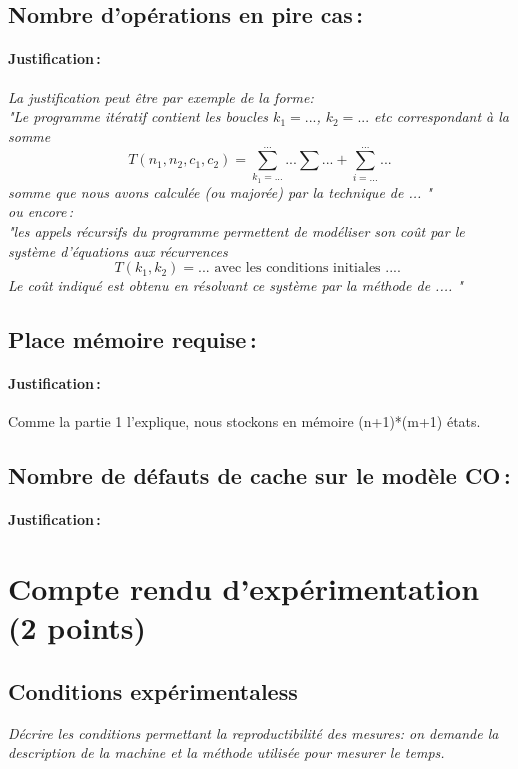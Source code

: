 \documentclass[a4paper, 10pt, french]{article}
\begin{document}
  \subsection{Nombre  d'opérations en pire cas\,: }
    \paragraph{Justification\,: }
    {\em La justification peut être par exemple de la forme: \\ 
       "Le programme itératif contient les boucles $k_1=...$, $k_2= ...$ etc correspondant à la somme 
      $$T(n_1, n_2, c_1, c_2) = \sum_{k_1=...}^{...} ... \sum ... + \sum_{i=...}^{...} ...$$ 
      somme que nous avons calculée (ou majorée) par la technique de  ... " \\
      ou  encore\,:  \\
      "les appels récursifs du programme permettent de modéliser son coût par le système d'équations aux récurrences 
      $$T(k_1, k_2) = ...  \mbox{~avec~les~conditions~initiales~....~} $$
      Le coût indiqué est obtenu en résolvant ce système par la méthode de  .... "
    } 
  \subsection{Place mémoire requise\,: }
    \paragraph{Justification\,: }
    {
    	Comme la partie 1 l'explique, nous stockons en mémoire (n+1)*(m+1) états.
    }

  \subsection{Nombre de défauts de cache sur le modèle CO\,: }
    \paragraph{Justification\,: }


\section{Compte rendu d'expérimentation (2 points)}
  \subsection{Conditions expérimentaless}
     {\em Décrire les conditions permettant la reproductibilité des mesures: on demande la description
      de la machine et la méthode utilisée pour mesurer le temps.
     }
\end{document}
